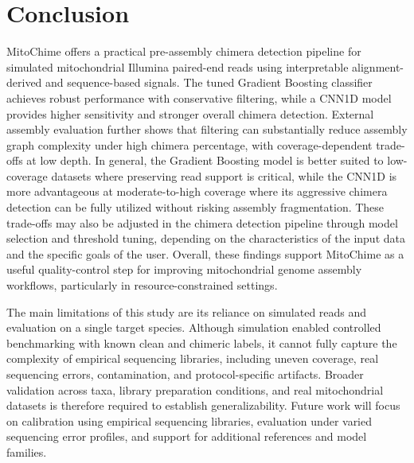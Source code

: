 \section{Conclusion}
MitoChime offers a practical pre-assembly chimera detection pipeline for simulated mitochondrial Illumina paired-end reads using interpretable alignment-derived and sequence-based signals. The tuned Gradient Boosting classifier achieves robust performance with conservative filtering, while a CNN1D model provides higher sensitivity and stronger overall chimera detection. External assembly evaluation further shows that filtering can substantially reduce assembly graph complexity under high chimera percentage, with coverage-dependent trade-offs at low depth. In general, the Gradient Boosting model is better suited to low-coverage datasets where preserving read support is critical, while the CNN1D is more advantageous at moderate-to-high coverage where its aggressive chimera detection can be fully utilized without risking assembly fragmentation. These trade-offs may also be adjusted in the chimera detection pipeline through model selection and threshold tuning, depending on the characteristics of the input data and the specific goals of the user. Overall, these findings support MitoChime as a useful quality-control step for  improving mitochondrial genome assembly workflows, particularly in resource-constrained settings.

The main limitations of this study are its reliance on simulated reads and evaluation on a single target species. Although simulation enabled controlled benchmarking with known clean and chimeric labels, it cannot fully capture the complexity of empirical sequencing libraries, including uneven coverage, real sequencing errors, contamination, and protocol-specific artifacts. Broader validation across taxa, library preparation conditions, and real mitochondrial datasets is therefore required to establish generalizability. Future work will focus on calibration using empirical sequencing libraries, evaluation under varied sequencing error profiles, and support for additional references and model families.


